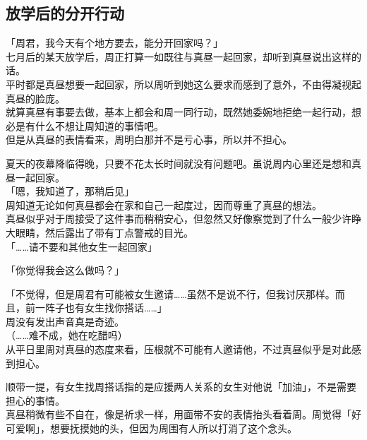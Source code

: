 \subsection{放学后的分开行动}

「周君，我今天有个地方要去，能分开回家吗？」\\

七月后的某天放学后，周正打算一如既往与真昼一起回家，却听到真昼说出这样的话。\\

平时都是真昼想要一起回家，所以周听到她这么要求而感到了意外，不由得凝视起真昼的脸庞。\\

就算真昼有事要去做，基本上都会和周一同行动，既然她委婉地拒绝一起行动，想必是有什么不想让周知道的事情吧。\\

但是从真昼的表情看来，周明白那并不是亏心事，所以并不担心。

夏天的夜幕降临得晚，只要不花太长时间就没有问题吧。虽说周内心里还是想和真昼一起回家。\\

「嗯，我知道了，那稍后见」\\

周知道无论如何真昼都会在家和自己一起度过，因而尊重了真昼的想法。\\

真昼似乎对于周接受了这件事而稍稍安心，但忽然又好像察觉到了什么一般少许睁大眼睛，然后露出了带有丁点警戒的目光。\\

「……请不要和其他女生一起回家」

「你觉得我会这么做吗？」

「不觉得，但是周君有可能被女生邀请……虽然不是说不行，但我讨厌那样。而且，前一阵子也有女生找你搭话……」\\

周没有发出声音真是奇迹。\\

（……难不成，她在吃醋吗）\\

从平日里周对真昼的态度来看，压根就不可能有人邀请他，不过真昼似乎是对此感到担心。

顺带一提，有女生找周搭话指的是应援两人关系的女生对他说「加油」，不是需要担心的事情。\\

真昼稍微有些不自在，像是祈求一样，用面带不安的表情抬头看着周。周觉得「好可爱啊」，想要抚摸她的头，但因为周围有人所以打消了这个念头。\\


